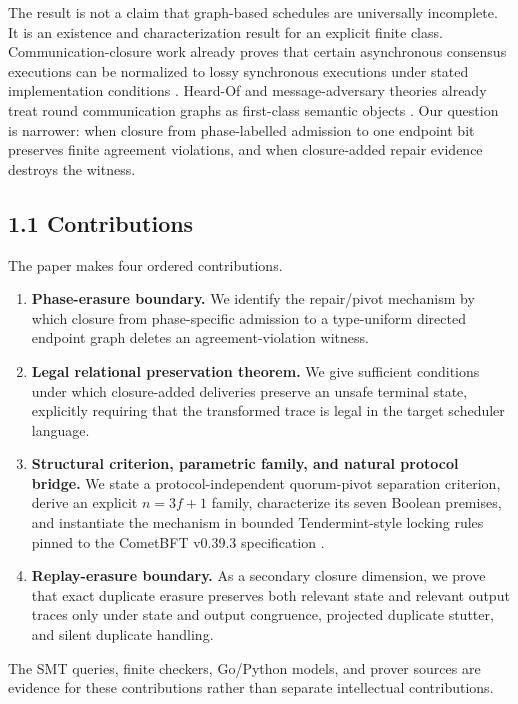 The result is not a claim that graph-based schedules are universally
incomplete. It is an existence and characterization result for an
explicit finite class. Communication-closure work already proves that
certain asynchronous consensus executions can be normalized to lossy
synchronous executions under stated implementation conditions
\cite{dragoi2020communication}. Heard-Of and message-adversary theories
already treat round communication graphs as first-class semantic objects
\cite{charronbost2009heardof,winkler2020closed}. Our question is
narrower: when closure from phase-labelled admission to one endpoint bit
preserves finite agreement violations, and when closure-added repair
evidence destroys the witness.

\subsection{1.1 Contributions}\label{contributions}

The paper makes four ordered contributions.

\begin{enumerate}
\def\labelenumi{\arabic{enumi}.}
\tightlist
\item
  \textbf{Phase-erasure boundary.} We identify the repair/pivot
  mechanism by which closure from phase-specific admission to a
  type-uniform directed endpoint graph deletes an agreement-violation
  witness.
\item
  \textbf{Legal relational preservation theorem.} We give sufficient
  conditions under which closure-added deliveries preserve an unsafe
  terminal state, explicitly requiring that the transformed trace is
  legal in the target scheduler language.
\item
  \textbf{Structural criterion, parametric family, and natural protocol
  bridge.} We state a protocol-independent quorum-pivot separation
  criterion, derive an explicit \(n=3f+1\) family, characterize its
  seven Boolean premises, and instantiate the mechanism in bounded
  Tendermint-style locking rules pinned to the CometBFT v0.39.3
  specification \cite{cometbft0393}.
\item
  \textbf{Replay-erasure boundary.} As a secondary closure dimension, we
  prove that exact duplicate erasure preserves both relevant state and
  relevant output traces only under state and output congruence,
  projected duplicate stutter, and silent duplicate handling.
\end{enumerate}

The SMT queries, finite checkers, Go/Python models, and prover sources
are evidence for these contributions rather than separate intellectual
contributions.

